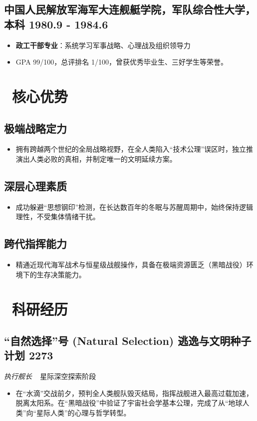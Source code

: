 \documentclass[11pt]{article}       %
\newcommand{\datedsubsection}[2]{   %
  \subsection[#1]{#1 \hfill #2}     %
}
\newcommand{\role}[2]{                 %
  {\par \textit{#1} ~ #2 \par}         %
  \vspace{0.5ex}                       
}
\begin{document}
\datedsubsection{\textbf{中国人民解放军海军大连舰艇学院}，军队综合性大学，\textbf{本科}}{1980.9 - 1984.6}
\begin{itemize} [parsep=0.5ex]
  \item \textbf{政工干部专业}：系统学习军事战略、心理战及组织领导力
  \item GPA 99/100，总评排名 1/100，曾获优秀毕业生、三好学生等荣誉。
\end{itemize}



\vspace*{0.1cm}
\section{\textcolor{myblue}{\faChild}\ 核心优势}
\datedsubsection{\textbf{极端战略定力}}{}
\begin{itemize}[parsep=0.5ex, itemsep=0.5ex]
  \item 拥有跨越两个世纪的全局战略视野，在全人类陷入“技术公理”误区时，独立推演出人类必败的真相，并制定唯一的文明延续方案。
\end{itemize}

\datedsubsection{\textbf{深层心理素质}}{}
\begin{itemize}[parsep=0.5ex]
  \item 成功躲避“思想钢印”检测，在长达数百年的冬眠与苏醒周期中，始终保持逻辑理性，不受集体情绪干扰。
\end{itemize}

\datedsubsection{\textbf{跨代指挥能力}}{}
\begin{itemize}[parsep=0.5ex]
  \item 精通近现代海军战术与恒星级战舰操作，具备在极端资源匮乏（黑暗战役）环境下的生存决策能力。
\end{itemize}



\vspace*{0.1cm}
\section{\textcolor{myblue}{\faFlask}\ 科研经历}
\datedsubsection{\textbf{“自然选择”号 (Natural Selection) 逃逸与文明种子计划}}{2273}
\role{执行舰长}{星际深空探索阶段}
\begin{itemize}[parsep=0.5ex]
    \item 在“水滴”交战前夕，预判全人类舰队毁灭结局，指挥战舰进入最高过载加速，脱离太阳系。在“黑暗战役”中验证了宇宙社会学基本公理，完成了从“地球人类”向“星际人类”的心理与哲学转型。
\end{itemize}
\end{document}
